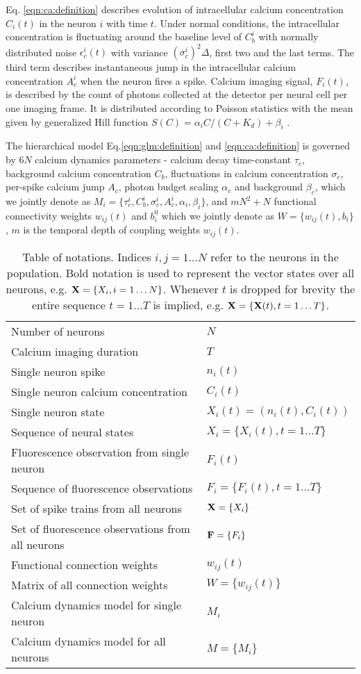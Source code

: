 Eq. \eqref{eqn:ca:definition} describes evolution of intracellular calcium concentration $C_i(t)$ in the neuron $i$ with time $t$. Under normal conditions, the intracellular concentration is fluctuating around the baseline level of $C^i_b$ with normally distributed noise $\epsilon^i_c(t)$ with variance $(\sigma^i_c)^2\Delta$, first two and the last terms.  The third term describes instantaneous jump in the intracellular calcium concentration $A^i_c$ when the neuron fires a spike.  Calcium imaging signal, $F_i(t)$, is described by the count of photons collected at the detector per neural cell per one imaging frame. It is distributed according to Poisson statistics with the mean given by generalized Hill function $S(C)=\alpha_i C/(C+K_d) + \beta_i$ \cite{Yasuda2004}.

The hierarchical model Eq.\eqref{eqn:glm:definition} and \eqref{eqn:ca:definition} is governed by $6N$ calcium dynamics parameters - calcium decay time-constant $\tau_c$, background calcium concentration $C_{b}$, fluctuations in calcium concentration $\sigma_c$, per-spike calcium jump $A_c$, photon budget scaling $\alpha_c$ and background $\beta_c$, which we jointly denote as $M_i=\{\tau^i_c, C^i_{b}, \sigma^i_c, A^i_c, \alpha_i, \beta_i\}$, and $m N^2 + N$ functional connectivity weights $w_{ij}(t)$ and $b^0_i$ which we jointly denote as $W=\{w_{ij}(t), b_i\}$, $m$ is the temporal depth of coupling weights $w_{ij}(t)$.


\begin{table}[h!b!p!]
\caption{Table of notations. Indices $i, j=1\ldots N$ refer to the neurons in the population. Bold notation is used to represent the vector states over all neurons, e.g. ${\bf X}=\{X_i, i=1\ldots N\}$. Whenever $t$ is dropped for brevity the entire sequence $t=1\ldots T$ is implied, e.g. ${\bf X}=\{{\bf X}(t), t=1\ldots T\}$.}
\label{table:notation}
\begin{tabular}{ll}
Number of neurons         & $N$ \\
Calcium imaging duration & $T$ \\
Single neuron spike & $n_i(t)$ \\
Single neuron calcium concentration & $C_i(t)$ \\
Single neuron state & $X_i(t)=(n_i(t), C_i(t))$ \\
Sequence of neural states & $X_i=\{X_i(t), t=1\ldots T\}$ \\
Fluorescence observation from single neuron & $F_i(t)$ \\
Sequence of fluorescence observations & $F_i=\{F_i(t), t=1\ldots T\}$ \\
Set of spike trains from all neurons   & ${\bf X}=\{X_i\}$ \\
Set of fluorescence observations from all neurons & ${\bf F}=\{F_i\}$ \\
Functional connection weights & $w_{ij}(t)$ \\
Matrix of all connection weights & $W=\{w_{ij}(t)\}$ \\
Calcium dynamics model for single neuron & $M_i$ \\
Calcium dynamics model for all neurons & $M=\{M_i\}$
\end{tabular}
\end{table}